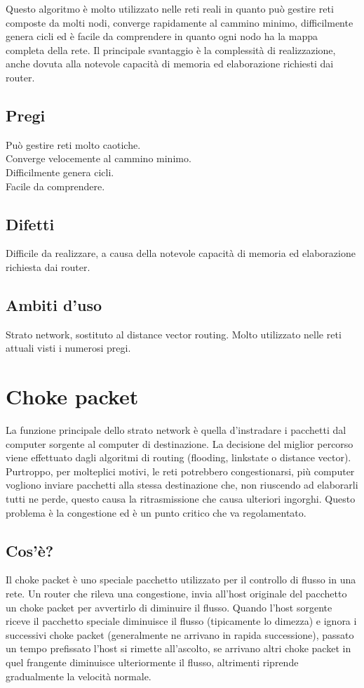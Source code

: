 Questo algoritmo è molto utilizzato nelle reti reali in quanto può gestire reti composte da molti nodi, converge rapidamente al cammino minimo, difficilmente genera cicli ed è facile da comprendere in quanto ogni nodo ha la mappa completa della rete. Il principale svantaggio è la complessità di realizzazione, anche dovuta alla notevole capacità di memoria ed elaborazione richiesti dai router.

\subsection{Pregi}
Può gestire reti molto caotiche.\\
Converge velocemente al cammino minimo.\\
Difficilmente genera cicli.\\
Facile da comprendere.

\subsection{Difetti}
Difficile da realizzare, a causa della notevole capacità di memoria ed elaborazione richiesta dai router.

\subsection{Ambiti d'uso}
Strato network, sostituto al distance vector routing.
Molto utilizzato nelle reti attuali visti i numerosi pregi.

\section{Choke packet}

La funzione principale dello strato network è quella d’instradare i pacchetti dal computer sorgente al computer di destinazione. La decisione del miglior percorso viene effettuato dagli algoritmi di routing (flooding, linkstate o distance vector). Purtroppo, per molteplici motivi, le reti potrebbero congestionarsi, più computer vogliono inviare pacchetti alla stessa destinazione che, non riuscendo ad elaborarli tutti ne perde, questo causa la ritrasmissione che causa ulteriori ingorghi. Questo problema è la congestione ed è un punto critico che va regolamentato.
\subsection{Cos'è?}
Il choke packet è uno speciale pacchetto utilizzato per il controllo di flusso in una rete. Un router che rileva una congestione, invia all’host originale del pacchetto un choke packet per avvertirlo di diminuire il flusso. Quando l’host sorgente riceve il pacchetto speciale diminuisce il flusso (tipicamente lo dimezza) e ignora i successivi choke packet (generalmente ne arrivano in rapida successione), passato un tempo prefissato l’host si rimette all’ascolto, se arrivano altri choke packet in quel frangente diminuisce ulteriormente il flusso, altrimenti riprende gradualmente la velocità normale.

